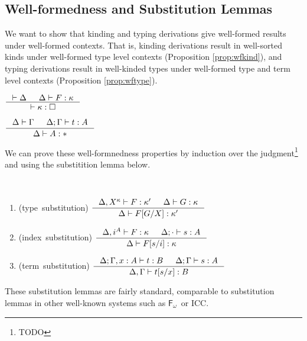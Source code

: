 \documentclass{llncs}
\newcommand{\Fw}{\ensuremath{\mathsf{F}_\omega}}
\begin{document}
\subsection{Well-formedness and Substitution Lemmas} \label{ssec:wf}

We want to show that kinding and typing derivations give
well-formed results under well-formed contexts. That is,
kinding derivations result in well-sorted kinds
under well-formed type level contexts (Proposition \ref{prop:wfkind}), and
typing derivations result in well-kinded types
under well-formed type and term level contexts (Proposition \ref{prop:wftype}).
\begin{proposition}
\label{prop:wfkind}
$ \inference{ |- \Delta & \Delta |- F : \kappa}{ |- \kappa:\square } $
\end{proposition}
\begin{proposition} \label{prop:wftype}
$ \inference{ \Delta |- \Gamma & \Delta;\Gamma |- t : A}{ \Delta |- A : * } $
\end{proposition}
We can prove these well-formnedness properties
by induction over the judgment\footnote{TODO}
and using the substitition lemma below.

\begin{lemma}[substitution]\mbox{}\\[-3mm]
\label{lem:subst}
\begin{enumerate}
\item
\label{lem:tysubst}
\mbox{\rm (type substitution)}
$\inference{\Delta,X^\kappa |- F:\kappa' & \Delta |- G:\kappa}
        {\Delta |- F[G/X]:\kappa'} $
\medskip

\item
\label{lem:ixsubst}
\mbox{\rm (index substitution)}
$ \inference{\Delta,i^A |- F:\kappa & \Delta;\cdot |- s:A}
        {\Delta |- F[s/i]:\kappa} $
\medskip

\item
\label{lem:tmsubst}
\mbox{\rm (term substitution)}
$ \inference{\Delta;\Gamma,x:A |- t:B & \Delta;\Gamma |- s:A}
        {\Delta,\Gamma |- t[s/x]:B} $
\end{enumerate}
\end{lemma}
These substitution lemmas are fairly standard,
comparable to substitution lemmas
in other well-known systems such as \Fw\ or ICC.
\end{document}
